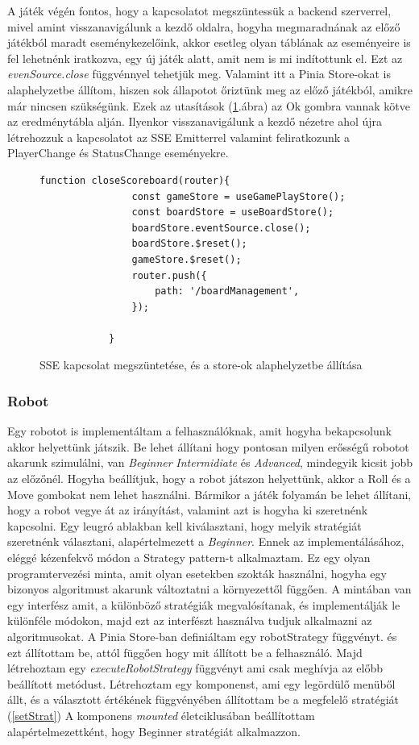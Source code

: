 \documentclass[a4paper,twoside]{article}
\begin{document}
A játék végén fontos, hogy a kapcsolatot megszüntessük a backend szerverrel, mivel amint visszanavigálunk a kezdő oldalra, hogyha megmaradnának az előző játékból maradt eseménykezelőink, akkor esetleg olyan táblának az eseményeire is fel lehetnénk iratkozva, egy új játék alatt, amit nem is mi indítottunk el. Ezt az \textit{evenSource.close} függvénnyel tehetjük meg. Valamint itt a Pinia Store-okat is alaphelyzetbe állítom, hiszen sok állapotot őriztünk meg az előző játékból, amikre már nincsen szükségünk. Ezek az utasítások (\ref{reset}.ábra) az Ok gombra vannak kötve az eredménytábla alján. Ilyenkor visszanavigálunk a kezdő nézetre ahol újra létrehozzuk a kapcsolatot az SSE Emitterrel valamint feliratkozunk a PlayerChange és StatusChange eseményekre.  
\begin{figure}
	\caption{SSE kapcsolat megszüntetése, és a store-ok alaphelyzetbe állítása}
	\begin{minipage}{\textwidth}
		\begin{lstlisting}[style=javascriptStyle]
			function closeScoreboard(router){
				const gameStore = useGamePlayStore();
				const boardStore = useBoardStore();
				boardStore.eventSource.close();
				boardStore.$reset();
				gameStore.$reset();
				router.push({
					path: '/boardManagement',
				});
				
			}
		\end{lstlisting}
	\end{minipage}
	
	\label{reset}
\end{figure}
\FloatBarrier
\subsubsection{Robot}
Egy robotot is implementáltam a felhasználóknak, amit hogyha bekapcsolunk akkor helyettünk játszik. Be lehet állítani hogy pontosan milyen erősségű robotot akarunk szimulálni, van \textit{Beginner} \textit{Intermidiate} és \textit{Advanced}, mindegyik kicsit jobb az előzőnél. Hogyha beállítjuk, hogy a robot játszon helyettünk, akkor a Roll és a Move gombokat nem lehet használni. Bármikor a játék folyamán be lehet állítani, hogy a robot vegye át az irányítást, valamint azt is hogyha ki szeretnénk kapcsolni. Egy leugró ablakban kell kiválasztani, hogy melyik stratégiát szeretnénk választani, alapértelmezett a \textit{Beginner}. Ennek az implementálásához, eléggé kézenfekvő módon a Strategy pattern-t alkalmaztam. Ez egy olyan programtervezési minta, amit olyan esetekben szokták használni, hogyha egy bizonyos algoritmust akarunk változtatni a környezettől függően. A mintában van egy interfész amit, a különböző stratégiák megvalósítanak, és implementálják le különféle módokon, majd ezt az interfészt használva tudjuk alkalmazni az algoritmusokat. A Pinia Store-ban definiáltam egy robotStrategy függvényt. és ezt állítottam be, attól függően hogy mit állított be a felhasználó. Majd létrehoztam egy \textit{executeRobotStrategy} függvényt ami csak meghívja az előbb beállított metódust. Létrehoztam egy komponenst, ami egy legördülő menüből állt, és a választott értékének függvényében állítottam be a megfelelő stratégiát (\ref{setStrat}) A komponens \textit{mounted} életciklusában beállítottam alapértelmezettként, hogy Beginner stratégiát alkalmazzon.
\end{document}
